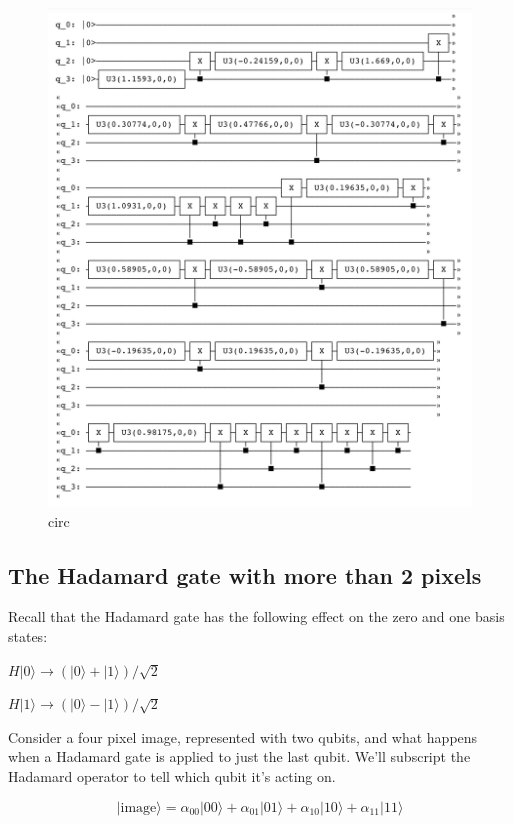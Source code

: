 \documentclass[11pt]{article}
\makeatletter
\def\maxwidth{\ifdim\Gin@nat@width>\linewidth\linewidth
    \else\Gin@nat@width\fi}
\let\Oldincludegraphics\includegraphics
\renewcommand{\includegraphics}[1]{\Oldincludegraphics[width=.8\maxwidth]{#1}}
\makeatother
\begin{document}
    \begin{figure}
\centering
\includegraphics{../img/circ.png}
\caption{circ}
\end{figure}

    \hypertarget{the-hadamard-gate-with-more-than-2-pixels}{%
\subsection{The Hadamard gate with more than 2
pixels}\label{the-hadamard-gate-with-more-than-2-pixels}}

    Recall that the Hadamard gate has the following effect on the zero and
one basis states:

\(H|0\rangle \rightarrow (|0\rangle + |1\rangle)/\sqrt{2}\)

\(H|1\rangle \rightarrow (|0\rangle - |1\rangle)/\sqrt{2}\)

Consider a four pixel image, represented with two qubits, and what
happens when a Hadamard gate is applied to just the last qubit. We'll
subscript the Hadamard operator to tell which qubit it's acting on.

\[ |\textrm{image}\rangle = \alpha_{00}|00\rangle + \alpha_{01}|01\rangle + \alpha_{10}|10\rangle + \alpha_{11}|11\rangle \]
\end{document}
